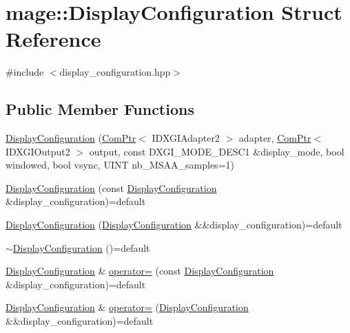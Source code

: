 \hypertarget{structmage_1_1_display_configuration}{}\section{mage\+:\+:Display\+Configuration Struct Reference}
\label{structmage_1_1_display_configuration}


{\ttfamily \#include $<$display\+\_\+configuration.\+hpp$>$}

\subsection*{Public Member Functions}
\begin{DoxyCompactItemize}
\item 
\hyperlink{structmage_1_1_display_configuration_a8c2bb805e60d4a18eeb7745c35f8b6da}{Display\+Configuration} (\hyperlink{namespacemage_ae74f374780900893caa5555d1031fd79}{Com\+Ptr}$<$ I\+D\+X\+G\+I\+Adapter2 $>$ adapter, \hyperlink{namespacemage_ae74f374780900893caa5555d1031fd79}{Com\+Ptr}$<$ I\+D\+X\+G\+I\+Output2 $>$ output, const D\+X\+G\+I\+\_\+\+M\+O\+D\+E\+\_\+\+D\+E\+S\+C1 \&display\+\_\+mode, bool windowed, bool vsync, U\+I\+NT nb\+\_\+\+M\+S\+A\+A\+\_\+samples=1)
\item 
\hyperlink{structmage_1_1_display_configuration_a1b99f5eb69a7ec1e525d551a8004f508}{Display\+Configuration} (const \hyperlink{structmage_1_1_display_configuration}{Display\+Configuration} \&display\+\_\+configuration)=default
\item 
\hyperlink{structmage_1_1_display_configuration_a5adbfbaf7de92292af56b2b56f76d548}{Display\+Configuration} (\hyperlink{structmage_1_1_display_configuration}{Display\+Configuration} \&\&display\+\_\+configuration)=default
\item 
\hyperlink{structmage_1_1_display_configuration_a91cdf4f2015177e41290238d96a55328}{$\sim$\+Display\+Configuration} ()=default
\item 
\hyperlink{structmage_1_1_display_configuration}{Display\+Configuration} \& \hyperlink{structmage_1_1_display_configuration_a43d4997e418b27add46442e88ba3672b}{operator=} (const \hyperlink{structmage_1_1_display_configuration}{Display\+Configuration} \&display\+\_\+configuration)=default
\item 
\hyperlink{structmage_1_1_display_configuration}{Display\+Configuration} \& \hyperlink{structmage_1_1_display_configuration_a56c175220b8f597afd7d5d6275b5d0de}{operator=} (\hyperlink{structmage_1_1_display_configuration}{Display\+Configuration} \&\&display\+\_\+configuration)=default

\end{DoxyCompactItemize}

